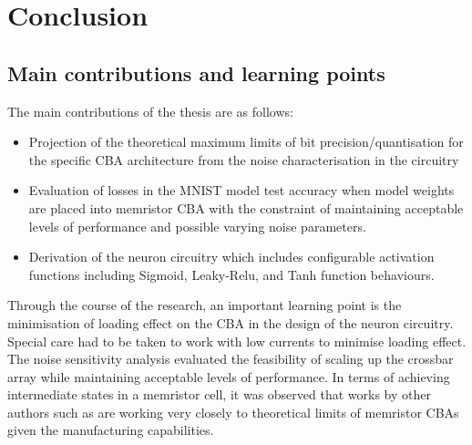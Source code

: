 
\chapter{Conclusion}
\label{ch:conclusion}

\vspace{2em}

\section{Main contributions and learning points}


\noindent
The main contributions of the thesis are as follows:

\begin{itemize}

    \item Projection of the theoretical maximum limits of bit precision/quantisation for the specific \ac{CBA} architecture from the noise characterisation in the circuitry

    \item Evaluation of losses in the MNIST model test accuracy when model weights are placed into memristor \ac{CBA} \textemdash{} with the constraint of maintaining acceptable levels of performance and possible varying noise parameters.

    \item Derivation of the neuron circuitry which includes configurable activation functions \textemdash{} including Sigmoid, Leaky-Relu, and Tanh function behaviours.

\end{itemize}


\noindent
Through the course of the research, an important learning point is the minimisation of loading effect on the \ac{CBA} in the design of the neuron circuitry. Special care had to be taken to work with low currents to minimise loading effect. The noise sensitivity analysis evaluated the feasibility of scaling up the crossbar array while maintaining acceptable levels of performance. In terms of achieving intermediate states in a memristor cell, it was observed that works by other authors such as \citet{PengGu2015} \cite{PengGu2015} are working very closely to theoretical limits of memristor \acp{CBA} given the manufacturing capabilities.

